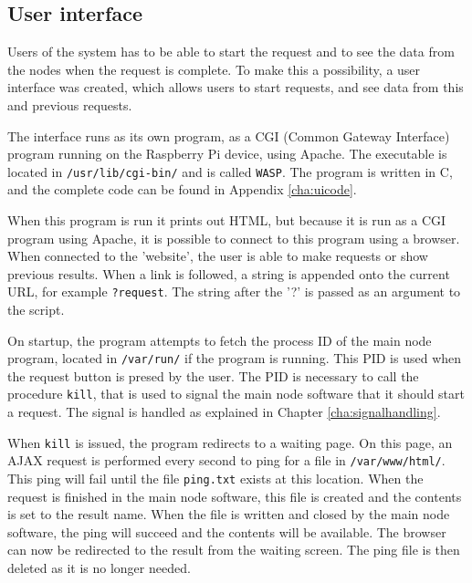 \subsection{User interface}
Users of the system has to be able to start the request and to see the data from the nodes when the request is complete. To make this a possibility, a user interface was created, which allows users to start requests, and see data from this and previous requests.

The interface runs as its own program, as a CGI (Common Gateway Interface) program running on the Raspberry Pi device, using Apache. The executable is located in \texttt{/usr/lib/cgi-bin/} and is called \texttt{WASP}. The program is written in C, and the complete code can be found in Appendix \ref{cha:uicode}.

When this program is run it prints out HTML, but because it is run as a CGI program using Apache, it is possible to connect to this program using a browser. When connected to the 'website', the user is able to make requests or show previous results. When a link is followed, a string is appended onto the current URL, for example \texttt{?request}. The string after the '?' is passed as an argument to the script.

On startup, the program attempts to fetch the process ID of the main node program, located in \texttt{/var/run/} if the program is running. This PID is used when the request button is presed by the user. The PID is necessary to call the procedure \texttt{kill}, that is used to signal the main node software that it should start a request. The signal is handled as explained in Chapter \ref{cha:signalhandling}.

When \texttt{kill} is issued, the program redirects to a waiting page. On this page, an AJAX request is performed every second to ping for a file in \texttt{/var/www/html/}. This ping will fail until the file \texttt{ping.txt} exists at this location. When the request is finished in the main node software, this file is created and the contents is set to the result name. When the file is written and closed by the main node software, the ping will succeed and the contents will be available. The browser can now be redirected to the result from the waiting screen. The ping file is then deleted as it is no longer needed.